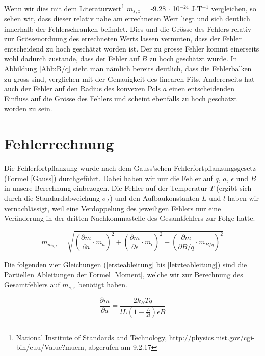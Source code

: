 \documentclass[a4paper,parskip,11pt, DIV12]{scrreprt}
\begin{document}
Wenn wir dies mit dem Literaturwert\footnote{National Institute of Standards and Technology, http://physics.nist.gov/cgi-bin/cuu/Value?muem, abgerufen am 9.2.17} $m_{s,z}$ = -9.28 $\cdot$ 10$^{-24}$ J$\cdot$T$^{-1}$ vergleichen, so sehen wir, dass dieser relativ nahe am errechneten Wert liegt und sich deutlich innerhalb der Fehlerschranken befindet. Dies und die Grösse des Fehlers relativ zur Grössenordnung des errechneten Werts lassen vermuten, dass der Fehler entscheidend zu hoch geschätzt worden ist. Der zu grosse Fehler kommt einerseits wohl dadurch zustande, dass der Fehler auf $B$ zu hoch geschätzt wurde. In Abbildung \ref{Abb:B/q} sieht man nämlich bereits deutlich, dass die Fehlerbalken zu gross sind, verglichen mit der Genauigkeit des linearen Fits.  Andererseits hat auch der Fehler auf den Radius des konvexen Pols $a$ einen entscheidenden Einfluss auf die Grösse des Fehlers und scheint ebenfalls zu hoch geschätzt worden zu sein. 


\clearpage


\chapter{Fehlerrechnung} \label{Fehlerrechnung}
Die Fehlerfortpflanzung wurde nach dem Gauss'schen Fehlerfortpflanzungsgesetz (Formel \ref{Gauss}) durchgeführt. Dabei haben wir nur die Fehler auf $q$, $a$, $\epsilon$ und $B$ in unsere Berechnung einbezogen. Die Fehler auf der Temperatur $T$ (ergibt sich durch die Standardabweichung $\sigma_T$) und den Aufbaukonstanten $L$ und $l$ haben wir vernachlässigt, weil eine Verdoppelung des jeweiligen Fehlers nur eine Veränderung in der dritten Nachkommastelle des Gesamtfehlers zur Folge hatte.


\begin{equation} \label{Gauss}
m_{m_{s,z}}=\sqrt{(\frac{\partial m}{\partial a} \cdot m_a)^2+(\frac{\partial m}{\partial \epsilon} \cdot m_\epsilon)^2+(\frac{\partial m}{\partial B/q} \cdot m_{B/q})^2}
\end{equation}

Die folgenden vier Gleichungen (\ref{ersteableitung} bis \ref{letzteableitung}) sind die Partiellen Ableitungen der Formel \ref{Moment}, welche wir zur Berechnung des Gesamtfehlers auf $m_{s,z}$ benötigt haben.

\begin{equation} \label{ersteableitung}
\frac{\partial m}{\partial a} = \frac{2k_BTq}{lL(1-\frac{L}{2l})\epsilon B}
\end{equation}
\end{document}
